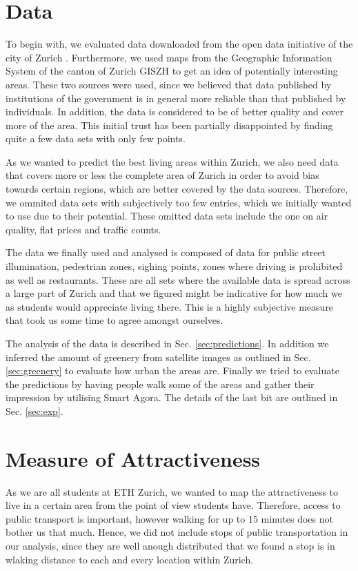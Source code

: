 \documentclass[letterpaper]{article}
\begin{document}
\section{Data}\label{sec:data}
To begin with, we evaluated data downloaded from the open data initiative of the city of Zurich \cite{ZurichOD}. Furthermore, we used maps from the Geographic Information System of the canton of Zurich GISZH \cite{GISZH} to get an idea of potentially interesting areas.
These two sources were used, since we believed that data published by institutions of the government is in general more reliable than that published by individuals. In addition, the data is considered to be of better quality and cover more of the area. This initial trust has been partially disappointed by finding quite a few data sets with only few points.

As we wanted to predict the best living areas within Zurich, we also need data that covers more or less the complete area of Zurich in order to avoid bias towards certain regions, which are better covered by the data sources. Therefore, we ommited data sets with subjectively too few entries, which we initially wanted to use due to their potential. These omitted data sets include the one on air quality, flat prices and traffic counts.

The data we finally used and analysed is composed of data for public street illumination, pedestrian zones, sighing points, zones where driving is prohibited as well as restaurants. These are all sets where the available data is spread across a large part of Zurich and that we figured might be indicative for how much we as students would appreciate living there. This is a highly subjective measure that took us some time to agree amongst ourselves.

The analysis of the data is described in Sec. \ref{sec:predictions}. In addition we inferred the amount of greenery from satellite images as outlined in Sec. \ref{sec:greenery} to evaluate how urban the areas are. Finally we tried to evaluate the predictions by having people walk some of the areas and gather their impression by utilising Smart Agora. The details of the last bit are outlined in Sec. \ref{sec:exp}.

\section{Measure of Attractiveness}\label{sec:attractiveness}
As we are all students at ETH Zurich, we wanted to map the attractiveness to live in a certain area from the point of view students have. Therefore, access to public transport is important, however walking for up to 15 minutes does not bother us that much. Hence, we did not include stops of public transportation in our analysis, since they are well anough distributed that we found a stop is in wlaking distance to each and every location within Zurich.
\end{document}
